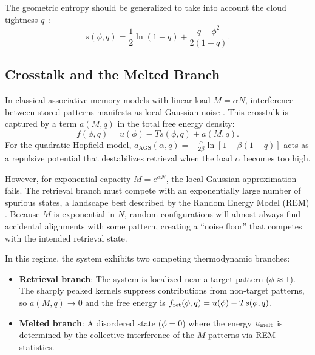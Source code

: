 \documentclass{article}
\theoremstyle{plain}
\theoremstyle{definition}
\theoremstyle{remark}
\begin{document}
The geometric entropy should be generalized to take into account the cloud tightness $q$~\cite{gardner1988space}:
\begin{equation}
    s(\phi, q) = \frac{1}{2} \ln(1-q) + \frac{q - \phi^2}{2(1-q)}.
\end{equation}

\subsection{Crosstalk and the Melted Branch}

In classical associative memory models with linear load $M = \alpha N$, interference between stored patterns manifests as local Gaussian noise \cite{amit1987statistical}. This crosstalk is captured by a term $a(M, q)$ in the total free energy density:
\begin{equation}
    f(\phi, q) = u(\phi) - T s(\phi, q) + a(M, q).
    \label{eq:total_free_energy}
\end{equation}
For the quadratic Hopfield model, $a_{\text{AGS}}(\alpha, q) = -\frac{\alpha}{2\beta} \ln [1 - \beta(1 - q)]$ acts as a repulsive potential that destabilizes retrieval when the load $\alpha$ becomes too high.

However, for exponential capacity $M = e^{\alpha N}$, the local Gaussian approximation fails. The retrieval branch must compete with an exponentially large number of spurious states, a landscape best described by the Random Energy Model (REM) \cite{derrida1980random}. Because $M$ is exponential in $N$, random configurations will almost always find accidental alignments with some pattern, creating a ``noise floor'' that competes with the intended retrieval state.

In this regime, the system exhibits two competing thermodynamic branches:
\begin{itemize}
    \item \textbf{Retrieval branch}: The system is localized near a target pattern ($\phi \approx 1$). The sharply peaked kernels suppress contributions from non-target patterns, so $a(M,q) \to 0$ and the free energy is $f_{\rm ret}(\phi, q) = u(\phi) - T s(\phi, q)$.
    \item \textbf{Melted branch}: A disordered state ($\phi = 0$) where the energy $u_{\rm melt}$ is determined by the collective interference of the $M$ patterns via REM statistics.
\end{itemize}
\end{document}
